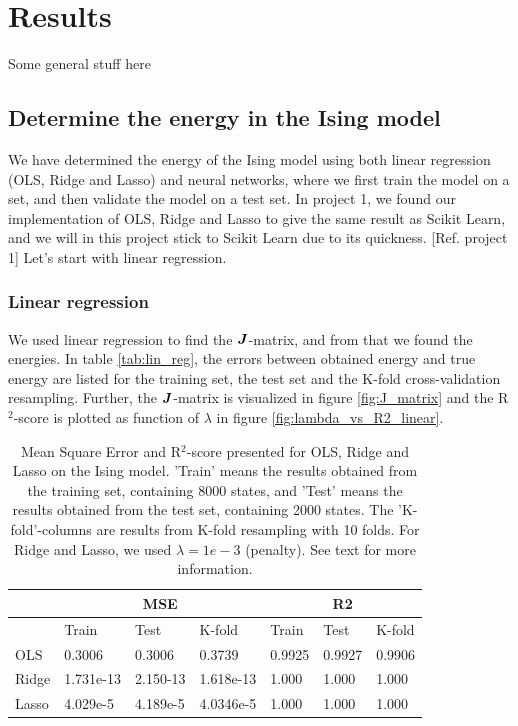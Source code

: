 \section{Results} \label{sec:results}
Some general stuff here

\subsection{Determine the energy in the Ising model}
We have determined the energy of the Ising model using both linear regression (OLS, Ridge and Lasso) and neural networks, where we first train the model on a set, and then validate the model on a test set. In project 1, we found our implementation of OLS, Ridge and Lasso to give the same result as Scikit Learn, and we will in this project stick to Scikit Learn due to its quickness. [Ref. project 1] Let's start with linear regression. 

\subsubsection{Linear regression}
We used linear regression to find the $\boldsymbol{J}$-matrix, and from that we found the energies. In table \eqref{tab:lin_reg}, the errors between obtained energy and true energy are listed for the training set, the test set and the K-fold cross-validation resampling. Further, the $\boldsymbol{J}$-matrix is visualized in figure \eqref{fig:J_matrix} and the R$^2$-score is plotted as function of $\lambda$ in figure \eqref{fig:lambda_vs_R2_linear}.

\begin{table} [H]
	\caption{Mean Square Error and R$^2$-score presented for OLS, Ridge and Lasso on the Ising model. 'Train' means the results obtained from the training set, containing 8000 states, and 'Test' means the results obtained from the test set, containing 2000 states. The 'K-fold'-columns are results from K-fold resampling with 10 folds. For Ridge and Lasso, we used $\lambda=1e-3$ (penalty). See text for more information.}
	\begin{tabularx}{\textwidth}{l|XXX|XXX} \hline\hline
		\label{tab:lin_reg}
		& \multicolumn{3}{c}{\textbf{MSE}}&\multicolumn{3}{c}{\textbf{R2}}\\ \hline
		&Train&Test&K-fold&Train&Test&K-fold\\ \hline
		OLS & 0.3006 & 0.3006 & 0.3739 & 0.9925 & 0.9927 & 0.9906\\
		Ridge & 1.731e-13 & 2.150-13 & 1.618e-13 & 1.000 & 1.000 & 1.000 \\
		Lasso & 4.029e-5 & 4.189e-5 & 4.0346e-5 & 1.000 & 1.000 & 1.000 \\ \hline\hline
	\end{tabularx}
\end{table}

